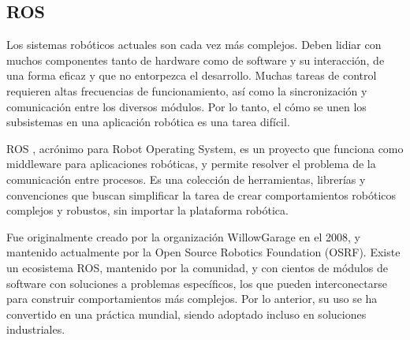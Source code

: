 \subsection{ROS}


Los sistemas robóticos actuales son cada vez más complejos. Deben lidiar con muchos componentes tanto de hardware como de software y su interacción, de una forma eficaz y que no entorpezca el desarrollo. Muchas tareas de control requieren altas frecuencias de funcionamiento, así como la sincronización y comunicación entre los diversos módulos. Por lo tanto, el cómo se unen los subsistemas en una aplicación robótica es una tarea difícil.

ROS \cite{ROS:2009}, acrónimo para Robot Operating System, es un proyecto que funciona como middleware para aplicaciones robóticas, y permite resolver el problema de la comunicación entre procesos. Es una colección de herramientas, librerías y convenciones que buscan simplificar la tarea de crear comportamientos robóticos complejos y robustos, sin importar la plataforma robótica.

Fue originalmente creado por la organización WillowGarage en el 2008, y mantenido actualmente por la Open Source Robotics Foundation (OSRF). Existe un ecosistema ROS, mantenido por la comunidad, y con cientos de módulos de software con soluciones a problemas específicos, los que pueden interconectarse para construir comportamientos más complejos. Por lo anterior, su uso se ha convertido en una práctica mundial, siendo adoptado incluso en soluciones industriales.


%
%
%
%
%

